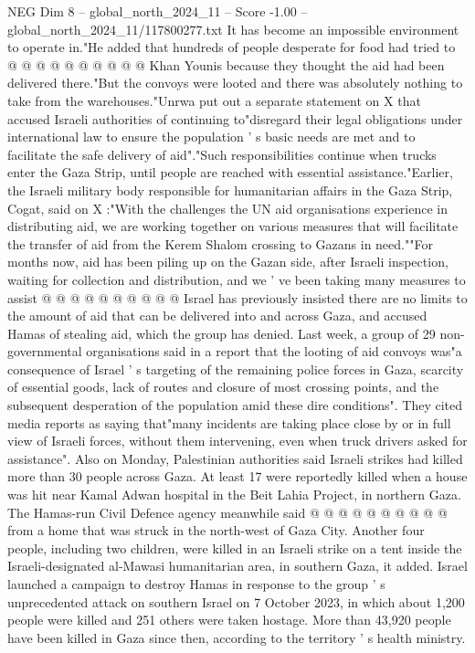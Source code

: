 \begin{textsample}{NEG Dim 8 – global\_north\_2024\_11 – Score -1.00 – global\_north\_2024\_11/117800277.txt}
It has become an impossible environment to operate in."He added that hundreds of people desperate for food had tried to @ @ @ @ @ @ @ @ @ @ Khan Younis because they thought the aid had been delivered there."But the convoys were looted and there was absolutely nothing to take from the warehouses."Unrwa put out a separate statement on X that accused Israeli authorities of continuing to"disregard their legal obligations under international law to ensure the population ' s basic needs are met and to facilitate the safe delivery of aid"."Such responsibilities continue when trucks enter the Gaza Strip, until people are reached with essential assistance."Earlier, the Israeli military body responsible for humanitarian affairs in the Gaza Strip, Cogat, said on X :"With the challenges the UN aid organisations experience in distributing aid, we are working together on various measures that will facilitate the transfer of aid from the Kerem Shalom crossing to Gazans in need.""For months now, aid has been piling up on the Gazan side, after Israeli inspection, waiting for collection and distribution, and we ' ve been taking many measures to assist @ @ @ @ @ @ @ @ @ @ Israel has previously insisted there are no limits to the amount of aid that can be delivered into and across Gaza, and accused Hamas of stealing aid, which the group has denied.
Last week, a group of 29 non-governmental organisations said in a report that the looting of aid convoys was"a consequence of Israel ' s targeting of the remaining police forces in Gaza, scarcity of essential goods, lack of routes and closure of most crossing points, and the subsequent desperation of the population amid these dire conditions".
They cited media reports as saying that"many incidents are taking place close by or in full view of Israeli forces, without them intervening, even when truck drivers asked for assistance".
Also on Monday, Palestinian authorities said Israeli strikes had killed more than 30 people across Gaza.
At least 17 were reportedly killed when a house was hit near Kamal Adwan hospital in the Beit Lahia Project, in northern Gaza.
The Hamas-run Civil Defence agency meanwhile said @ @ @ @ @ @ @ @ @ @ from a home that was struck in the north-west of Gaza City.
Another four people, including two children, were killed in an Israeli strike on a tent inside the Israeli-designated al-Mawasi humanitarian area, in southern Gaza, it added.
Israel launched a campaign to destroy Hamas in response to the group ' s unprecedented attack on southern Israel on 7 October 2023, in which about 1,200 people were killed and 251 others were taken hostage.
More than 43,920 people have been killed in Gaza since then, according to the territory ' s health ministry.

\end{textsample}
